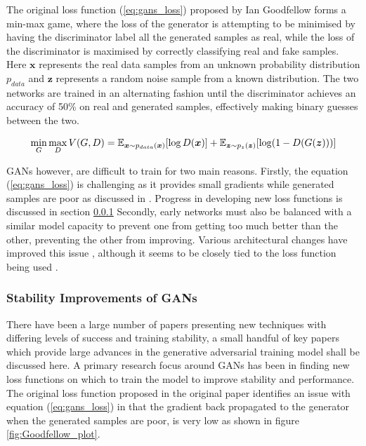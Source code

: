 The original loss function (\ref{eq:gans_loss}) proposed by Ian Goodfellow \cite{Goodfellow2014} forms a min-max game, where the loss of the generator is attempting to be minimised by having the discriminator label all the generated samples as real, while the loss of the discriminator is maximised by correctly classifying real and fake samples.
Here $\bm{x}$ represents the real data samples from an unknown probability distribution $p_{data}$ and $\bm{z}$ represents a random noise sample from a known distribution.
The two networks are trained in an alternating fashion until the discriminator achieves an accuracy of 50\% on real and generated samples, effectively making binary guesses between the two.

\begin{equation} \label{eq:gans_loss}
    \min_{G} \max_{D} V(G, D) = \mathbb{E}_{{\boldsymbol{{x}}} \sim p_{data}({\boldsymbol{{x}}})} [\log D({\boldsymbol{{x}}})]
                              + \mathbb{E}_{{\boldsymbol{{z}}} \sim p_{z}({\boldsymbol{{z}}})} [\log (1 - D(G({\boldsymbol{{z}}})))]
\end{equation}
\quad

GANs however, are difficult to train for two main reasons.
Firstly, the equation (\ref{eq:gans_loss}) is challenging as it provides small gradients while generated samples are poor as discussed in \cite{Goodfellow2014}.
Progress in developing new loss functions is discussed in section \ref{sec:Stability_to_GANs}
Secondly, early networks must also be balanced with a similar model capacity to prevent one from getting too much better than the other, preventing the other from improving.
Various architectural changes have improved this issue \cite{Radford2016, Zhang2018}, although it seems to be closely tied to the loss function being used \cite{Gulrajani2017}.

\subsubsection{Stability Improvements of GANs} \label{sec:Stability_to_GANs}
There have been a large number of papers presenting new techniques with differing levels of success and training stability, a small handful of key papers which provide large advances in the generative adversarial training model shall be discussed here.
A primary research focus around GANs has been in finding new loss functions on which to train the model to improve stability and performance.
The original loss function proposed in the original paper \cite{Goodfellow2014} identifies an issue with equation (\ref{eq:gans_loss}) in that the gradient back propagated to the generator when the generated samples are poor, is very low as shown in figure \ref{fig:Goodfellow_plot}.

